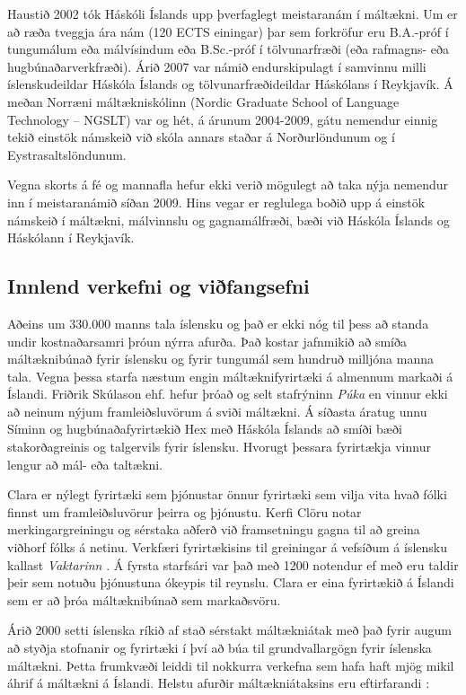 \begin{multicols}{2}
Haustið 2002 tók Háskóli Íslands upp þverfaglegt meistaranám í máltækni. Um er að ræða tveggja ára nám (120 ECTS einingar) þar sem forkröfur eru B.A.-próf í tungumálum eða málvísindum eða B.Sc.-próf í tölvunarfræði (eða rafmagns- eða hugbúnaðarverkfræði). Árið 2007 var námið endurskipulagt í samvinnu milli íslenskudeildar Háskóla Íslands og tölvunarfræðideildar Háskólans í Reykjavík. Á meðan Norræni máltækniskólinn (Nordic Graduate School of Language Technology -- NGSLT) var og hét, á árunum 2004-2009, gátu nemendur einnig tekið einstök námskeið við skóla annars staðar á Norðurlöndunum og í Eystrasaltslöndunum.

Vegna skorts á fé og mannafla hefur ekki verið mögulegt að taka nýja nemendur inn í meistaranámið síðan 2009. Hins vegar er reglulega boðið upp á einstök námskeið í máltækni, málvinnslu og gagnamálfræði, bæði við Háskóla Íslands og Háskólann í Reykjavík.

\subsection{Innlend verkefni og viðfangsefni}

Aðeins um 330.000 manns tala íslensku og það er ekki nóg til þess að standa undir kostnaðarsamri þróun nýrra afurða. Það kostar jafnmikið að smíða máltæknibúnað fyrir íslensku og fyrir tungumál sem hundruð milljóna manna tala. Vegna þessa starfa næstum engin máltæknifyrirtæki á almennum markaði á Íslandi. Friðrik Skúlason ehf. hefur þróað og selt stafrýninn \textit{Púka} en vinnur ekki að neinum nýjum framleiðsluvörum á sviði máltækni. Á síðasta áratug unnu Síminn og hugbúnaðafyrirtækið Hex með Háskóla Íslands að smíði bæði stakorðagreinis og talgervils fyrir íslensku. Hvorugt þessara fyrirtækja vinnur lengur að mál- eða taltækni.

Clara er nýlegt fyrirtæki sem þjónustar önnur fyrirtæki sem vilja vita hvað fólki finnst um framleiðsluvörur þeirra og þjónustu. Kerfi Clöru notar merkingargreiningu og sérstaka aðferð við framsetningu gagna til að greina viðhorf fólks á netinu. Verkfæri fyrirtækisins til greiningar á vefsíðum á íslensku kallast \textit{Vaktarinn} \cite{vak1}.  Á fyrsta starfsári var það með 1200 notendur ef með eru taldir þeir sem notuðu þjónustuna ókeypis til reynslu. Clara er eina fyrirtækið á Íslandi sem er að þróa máltæknibúnað sem markaðsvöru.

Árið 2000 setti íslenska ríkið af stað sérstakt máltækniátak með það fyrir augum að styðja stofnanir og fyrirtæki í því að búa til grundvallargögn fyrir íslenska máltækni. Þetta frumkvæði leiddi til nokkurra verkefna sem hafa haft mjög mikil áhrif á máltækni á Íslandi. Helstu afurðir máltækniátaksins eru eftirfarandi \cite{ilrt1}:


\end{multicols}
